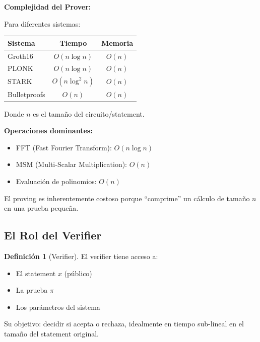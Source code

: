 \documentclass[11pt,a4paper,twoside,openright]{book}
\theoremstyle{definition}
\newtheorem{definition}{Definición}[chapter]
\theoremstyle{plain}
\theoremstyle{remark}
\begin{document}
\begin{mathnote}
\textbf{Complejidad del Prover:}

Para diferentes sistemas:

\begin{center}
\begin{tabular}{lcc}
\toprule
\textbf{Sistema} & \textbf{Tiempo} & \textbf{Memoria} \\
\midrule
Groth16 & $O(n \log n)$ & $O(n)$ \\
PLONK & $O(n \log n)$ & $O(n)$ \\
STARK & $O(n \log^2 n)$ & $O(n)$ \\
Bulletproofs & $O(n)$ & $O(n)$ \\
\bottomrule
\end{tabular}
\end{center}

Donde $n$ es el tamaño del circuito/statement.

\textbf{Operaciones dominantes:}
\begin{itemize}
    \item FFT (Fast Fourier Transform): $O(n \log n)$
    \item MSM (Multi-Scalar Multiplication): $O(n)$
    \item Evaluación de polinomios: $O(n)$
\end{itemize}

El proving es inherentemente costoso porque ``comprime'' un cálculo de tamaño $n$ en una prueba pequeña.
\end{mathnote}

\subsection{El Rol del Verifier}

\begin{definition}[Verifier]
El verifier tiene acceso a:
\begin{itemize}
    \item El statement $x$ (público)
    \item La prueba $\pi$
    \item Los parámetros del sistema
\end{itemize}

Su objetivo: decidir si acepta o rechaza, idealmente en tiempo sub-lineal en el tamaño del statement original.
\end{definition}
\end{document}
